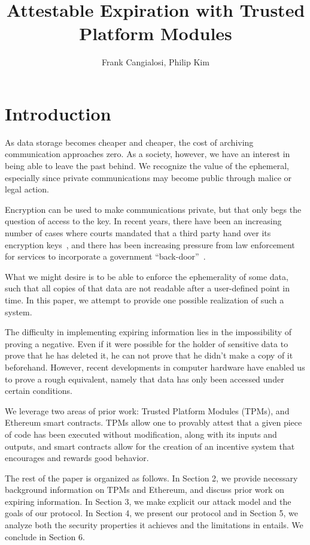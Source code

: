 \documentclass{article}
\begin{document}
\title{Attestable Expiration with Trusted Platform Modules}
\author{Frank Cangialosi, Philip Kim}

\maketitle

\section{Introduction}

As data storage becomes cheaper and cheaper, the cost of archiving communication approaches zero. As a society, however, we have an interest in being able to leave the past behind. We recognize the value of the ephemeral, especially since private communications may become public through malice or legal action.

Encryption can be used to make communications private, but that only begs the question of access to the key. In recent years, there have been an increasing number of cases where courts mandated that a third party hand over its encryption keys~\cite{hushmail}, and there has been increasing pressure from law enforcement for services to incorporate a government ``back-door''~\cite{backdoor}.

What we might desire is to be able to enforce the ephemerality of some data, such that all copies of that data are not readable after a user-defined point in time. In this paper, we attempt to provide one possible realization of such a system. 

The difficulty in implementing expiring information lies in the impossibility of proving a negative. Even if it were possible for the holder of sensitive data to prove that he has deleted it, he can not prove that he didn't make a copy of it beforehand. However, recent developments in computer hardware have enabled us to prove a rough equivalent, namely that data has only been accessed under certain conditions.

We leverage two areas of prior work: Trusted Platform Modules (TPMs), and Ethereum smart contracts. TPMs allow one to provably attest that a given piece of code has been executed without modification, along with its inputs and outputs, and smart contracts allow for the creation of an incentive system that encourages and rewards good behavior.

The rest of the paper is organized as follows. In Section 2, we provide necessary background information on TPMs and Ethereum, and discuss prior work on expiring information. In Section 3, we make explicit our attack model and the goals of our protocol. In Section 4, we present our protocol and in Section 5, we analyze both the security properties it achieves and the limitations in entails. We conclude in Section 6.
\end{document}
